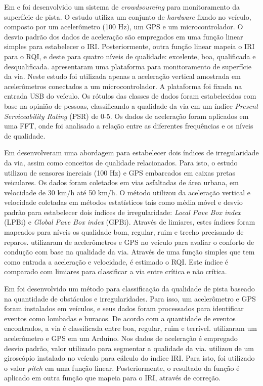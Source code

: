 Em  e  foi desenvolvido um sistema de \textit{crowdsourcing} para monitoramento da superfície de pista. O estudo utiliza um conjunto de \textit{hardware} fixado no veículo, composto por um acelerômetro (100 Hz), um GPS e um microcontrolador. O desvio padrão dos dados de aceleração são empregados em uma função linear simples para estabelecer o IRI. Posteriormente, outra função linear mapeia o IRI para o RQI, e deste para quatro níveis de qualidade: excelente, boa, qualificada e desqualificada.  apresentaram uma plataforma para monitoramento de superfície da via. Neste estudo foi utilizada apenas a aceleração vertical amostrada em acelerômetros conectados a um microcontrolador. A plataforma foi fixada na entrada USB do veículo. Os rótulos das classes de dados foram estabelecidos com base na opinião de pessoas, classificando a qualidade da via em um índice \textit{Present Serviceability Rating} (PSR) de 0-5. Os dados de aceleração foram aplicados em uma FFT, onde foi analisado a relação entre as diferentes frequências e os níveis de qualidade.

Em  desenvolveram uma abordagem para estabelecer dois índices de irregularidade da via, assim como conceitos de qualidade relacionados. Para isto, o estudo utilizou de sensores inerciais (100 Hz) e GPS embarcados em caixas pretas veiculares. Os dados foram coletados em vias asfaltadas de área urbana, em velocidade de 30 km/h até 50 km/h. O método utilizou da aceleração vertical e velocidade coletadas em métodos estatísticos tais como média móvel e desvio padrão para estabelecer dois índices de irregularidade: \textit{Local Pave Box index} (LPBi) e \textit{Global Pave Box index}  (GPBi). Através de limiares, estes índices foram mapeados para níveis os qualidade bom, regular, ruim e trecho precisando de reparos.  utilizaram de acelerômetros e GPS no veículo para avaliar o conforto de condução com base na qualidade da via. Através de uma função simples que tem como entrada a aceleração e velocidade, é estimado o RQI. Este índice é comparado com limiares para classificar a via entre crítica e não crítica.

Em  foi desenvolvido um método para classificação da qualidade de pista baseado na quantidade de obstáculos e irregularidades. Para isso, um acelerômetro e GPS foram instalados em veículos, e seus dados foram processados para identificar eventos como lombadas e buracos. De acordo com a quantidade de eventos encontrados, a via é classificada entre boa, regular, ruim e terrível.  utilizaram um acelerômetro e GPS em um Arduíno. Nos dados de aceleração é empregado desvio padrão, valor utilizado para segmentar a qualidade da via.  utilizou de um giroscópio instalado no veículo para cálculo do índice IRI. Para isto, foi utilizado o valor \textit{pitch} em uma função linear. Posteriormente, o resultado da função é aplicado em outra função que mapeia para o IRI, através de correção.

